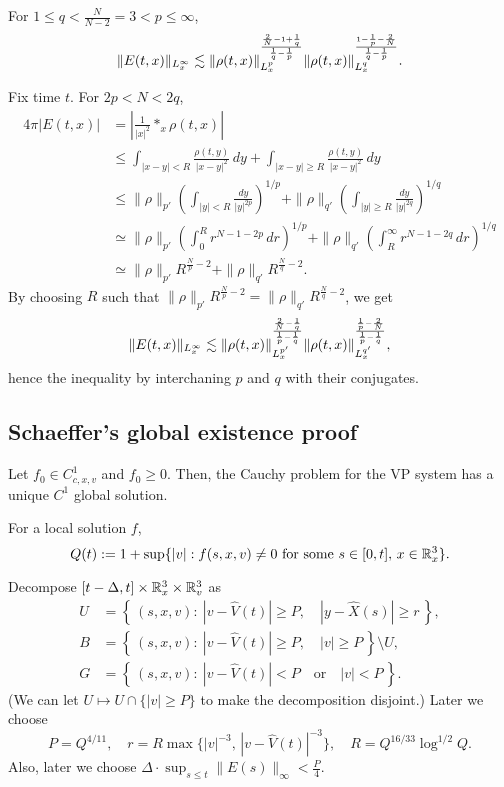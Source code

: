 \documentclass[11pt]{amsart}
\begin{document}
\begin{lem}
For $1\le q<\frac N{N-2}=3<p\le\infty$,
\[\|E(t,x)\|_{L_x^\infty}\lesssim\|\rho(t,x)\|_{L_x^p}^{\frac{\frac2N-1+\frac1q}{\frac1q-\frac1p}}\|\rho(t,x)\|_{L_x^q}^{\frac{1-\frac1p-\frac2N}{\frac1q-\frac1p}}.\]
\end{lem}
\begin{pf}
Fix time $t$.
For $2p<N<2q$,
\begin{align*}
4\pi|E(t,x)|
&=|\tfrac1{|x|^2}*_x\rho(t,x)|\\
&\le\int_{|x-y|<R}\frac{\rho(t,y)}{|x-y|^2}\,dy+\int_{|x-y|\ge R}\frac{\rho(t,y)}{|x-y|^2}\,dy\\
&\le\|\rho\|_{p'}(\int_{|y|<R}\frac{dy}{|y|^{2p}})^{1/p}+\|\rho\|_{q'}(\int_{|y|\ge R}\frac{dy}{|y|^{2q}})^{1/q}\\
&\simeq\|\rho\|_{p'}(\int_0^Rr^{N-1-2p}\,dr)^{1/p}+\|\rho\|_{q'}(\int_R^\infty r^{N-1-2q}\,dr)^{1/q}\\
&\simeq\|\rho\|_{p'}R^{\frac Np-2}+\|\rho\|_{q'}R^{\frac Nq-2}.
\end{align*}
By choosing $R$ such that $\|\rho\|_{p'}R^{\frac Np-2}=\|\rho\|_{q'}R^{\frac Nq-2}$, we get
\[\|E(t,x)\|_{L_x^\infty}\lesssim\|\rho(t,x)\|_{L_x^{p'}}^{\frac{\frac2N-\frac1q}{\frac1p-\frac1q}}\|\rho(t,x)\|_{L_x^{q'}}^{\frac{\frac1p-\frac2N}{\frac1p-\frac1q}},\]
hence the inequality by interchaning $p$ and $q$ with their conjugates.
\end{pf}



\clearpage
\subsection{Schaeffer's global existence proof}

\begin{thm*}[Schaeffer, 1991]
Let $f_0\in C_{c,x,v}^1$ and $f_0\ge0$.
Then, the Cauchy problem for the VP system has a unique $C^1$ global solution.
\end{thm*}

\begin{defn}
For a local solution $f$,
\[Q(t):=1+\sup\{|v|:f(s,x,v)\ne0\text{ for some }s\in[0,t],\,x\in\mathbb{R}_x^3\}.\]
\end{defn}

Decompose $[t-\Delta,t]\times\mathbb{R}_x^3\times\mathbb{R}_v^3$ as
\begin{align*}
U&=\left\{\,(s,x,v):\ |v-\hat V(t)|\ge P,\quad|y-\hat X(s)|\ge r\,\right\},\\
B&=\left\{\,(s,x,v):\ |v-\hat V(t)|\ge P,\quad|v|\ge P\,\right\}\setminus U,\\
G&=\left\{\,(s,x,v):\ |v-\hat V(t)|<P\quad\text{or}\quad|v|<P\,\right\}.
\end{align*}
(We can let $U\mapsto U\cap\{|v|\ge P\}$ to make the decomposition disjoint.)
Later we choose
\[P=Q^{4/11},\quad r=R\max\{|v|^{-3},\,|v-\hat V(t)|^{-3}\},\quad R=Q^{16/33}\log^{1/2}Q.\]
Also, later we choose $\Delta\cdot\sup_{s\le t}\|E(s)\|_\infty<\frac P4$.
\end{document}
